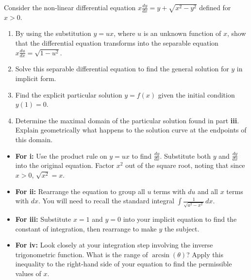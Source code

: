 \begin{problem}
Consider the non-linear differential equation $x \frac{dy}{dx} = y + \sqrt{x^2 - y^2}$ defined for $x > 0$.

\begin{enumerate}
    \item[\textbf{i}] By using the substitution $y = ux$, where $u$ is an unknown function of $x$, show that the differential equation transforms into the separable equation $x \frac{du}{dx} = \sqrt{1 - u^2}$.
    \item[\textbf{ii}] Solve this separable differential equation to find the general solution for $y$ in implicit form.
    \item[\textbf{iii}] Find the explicit particular solution $y = f(x)$ given the initial condition $y(1) = 0$.
    \item[\textbf{iv}] Determine the maximal domain of the particular solution found in part \textbf{iii}. Explain geometrically what happens to the solution curve at the endpoints of this domain.
\end{enumerate}
\end{problem}

\begin{hint}
\begin{itemize}
    \item \textbf{For i:} Use the product rule on $y=ux$ to find $\frac{dy}{dx}$. Substitute both $y$ and $\frac{dy}{dx}$ into the original equation. Factor $x^2$ out of the square root, noting that since $x>0$, $\sqrt{x^2} = x$.
    \item \textbf{For ii:} Rearrange the equation to group all $u$ terms with $du$ and all $x$ terms with $dx$. You will need to recall the standard integral $\int \frac{1}{\sqrt{a^2-x^2}} \, dx$.
    \item \textbf{For iii:} Substitute $x=1$ and $y=0$ into your implicit equation to find the constant of integration, then rearrange to make $y$ the subject.
    \item \textbf{For iv:} Look closely at your integration step involving the inverse trigonometric function. What is the range of $\arcsin(\theta)$? Apply this inequality to the right-hand side of your equation to find the permissible values of $x$.
\end{itemize}
\end{hint}

